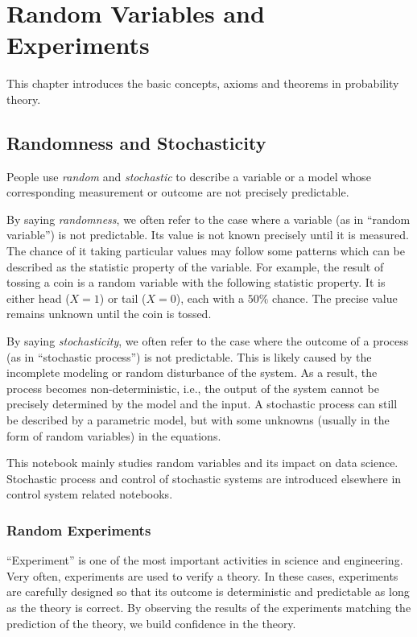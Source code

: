 \chapter{Random Variables and Experiments} \label{ch:pbbasics}

This chapter introduces the basic concepts, axioms and theorems in probability theory.

\section{Randomness and Stochasticity}

People use \textit{random} and \textit{stochastic} to describe a variable or a model whose corresponding measurement or outcome are not precisely predictable.

By saying \textit{randomness}, we often refer to the case where a variable (as in ``random variable'') is not predictable. Its value is not known precisely until it is measured. The chance of it taking particular values may follow some patterns which can be described as the statistic property of the variable. For example, the result of tossing a coin is a random variable with the following statistic property. It is either head ($X=1$) or tail ($X=0$), each with a $50\%$ chance. The precise value remains unknown until the coin is tossed.

By saying \textit{stochasticity}, we often refer to the case where the outcome of a process (as in ``stochastic process'') is not predictable. This is likely caused by the incomplete modeling or random disturbance of the system. As a result, the process becomes non-deterministic, i.e., the output of the system cannot be precisely determined by the model and the input. A stochastic process can still be described by a parametric model, but with some unknowns (usually in the form of random variables) in the equations.

This notebook mainly studies random variables and its impact on data science. Stochastic process and control of stochastic systems are introduced elsewhere in control system related notebooks.

\subsection{Random Experiments}

``Experiment'' is one of the most important activities in science and engineering. Very often, experiments are used to verify a theory. In these cases, experiments are carefully designed so that its outcome is deterministic and predictable as long as the theory is correct. By observing the results of the experiments matching the prediction of the theory, we build confidence in the theory.

